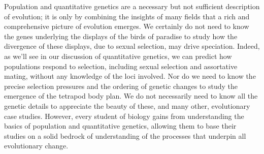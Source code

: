 Population and quantitative genetics are a necessary but not sufficient description of evolution; it is only by combining the insights of many fields that a rich and comprehensive picture of evolution emerges.
We certainly do not need to know the genes underlying the displays of the birds of paradise to study how the divergence of these displays, due to sexual selection, may drive speciation. Indeed, as we'll see in our discussion of quantitative genetics, we can predict how populations respond to selection, including sexual selection and assortative mating, without any knowledge of the loci involved. Nor do we need to know the precise selection pressures and the ordering of genetic changes to study the emergence of the tetrapod body plan. We do not necessarily need to know all the genetic details to appreciate the beauty of these, and many other, evolutionary case studies. However, every student of biology gains from understanding the basics of population and quantitative genetics, allowing them to base their studies on a solid bedrock of understanding of the processes that underpin all evolutionary change.






